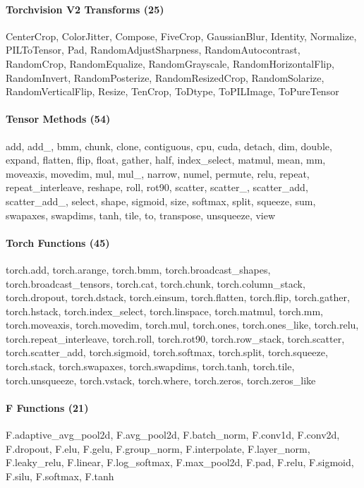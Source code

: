\documentclass[10pt]{article}
\begin{document}
\paragraph{Torchvision V2 Transforms (25)}
{\footnotesize CenterCrop, ColorJitter, Compose, FiveCrop, GaussianBlur, Identity, Normalize, PILToTensor, Pad, RandomAdjustSharpness, RandomAutocontrast, RandomCrop, RandomEqualize, RandomGrayscale, RandomHorizontalFlip, RandomInvert, RandomPosterize, RandomResizedCrop, RandomSolarize, RandomVerticalFlip, Resize, TenCrop, ToDtype, ToPILImage, ToPureTensor}

\paragraph{Tensor Methods (54)}
{\footnotesize add, add\_, bmm, chunk, clone, contiguous, cpu, cuda, detach, dim, double, expand, flatten, flip, float, gather, half, index\_select, matmul, mean, mm, moveaxis, movedim, mul, mul\_, narrow, numel, permute, relu, repeat, repeat\_interleave, reshape, roll, rot90, scatter, scatter\_, scatter\_add, scatter\_add\_, select, shape, sigmoid, size, softmax, split, squeeze, sum, swapaxes, swapdims, tanh, tile, to, transpose, unsqueeze, view}

\paragraph{Torch Functions (45)}
{\footnotesize torch.add, torch.arange, torch.bmm, torch.broadcast\_shapes, torch.broadcast\_tensors, torch.cat, torch.chunk, torch.column\_stack, torch.dropout, torch.dstack, torch.einsum, torch.flatten, torch.flip, torch.gather, torch.hstack, torch.index\_select, torch.linspace, torch.matmul, torch.mm, torch.moveaxis, torch.movedim, torch.mul, torch.ones, torch.ones\_like, torch.relu, torch.repeat\_interleave, torch.roll, torch.rot90, torch.row\_stack, torch.scatter, torch.scatter\_add, torch.sigmoid, torch.softmax, torch.split, torch.squeeze, torch.stack, torch.swapaxes, torch.swapdims, torch.tanh, torch.tile, torch.unsqueeze, torch.vstack, torch.where, torch.zeros, torch.zeros\_like}

\paragraph{F Functions (21)}
{\footnotesize F.adaptive\_avg\_pool2d, F.avg\_pool2d, F.batch\_norm, F.conv1d, F.conv2d, F.dropout, F.elu, F.gelu, F.group\_norm, F.interpolate, F.layer\_norm, F.leaky\_relu, F.linear, F.log\_softmax, F.max\_pool2d, F.pad, F.relu, F.sigmoid, F.silu, F.softmax, F.tanh}
\end{document}
